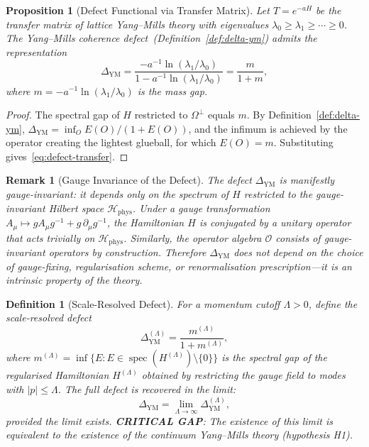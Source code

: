 \documentclass[11pt]{article}
\newtheorem{proposition}[theorem]{Proposition}
\newtheorem{definition}[theorem]{Definition}
\newtheorem{remark}[theorem]{Remark}
\DeclareMathOperator{\spec}{spec}
\begin{document}
\begin{proposition}[Defect Functional via Transfer Matrix]
\label{prop:defect-transfer}
Let $T = e^{-aH}$ be the transfer matrix of lattice Yang--Mills theory
with eigenvalues $\lambda_0 \geq \lambda_1 \geq \cdots \geq 0$.  The
Yang--Mills coherence defect~(Definition~\ref{def:delta-ym}) admits the
representation
\begin{equation}\label{eq:defect-transfer}
  \Delta_{\mathrm{YM}}
  = \frac{-a^{-1}\ln(\lambda_1/\lambda_0)}{1 - a^{-1}\ln(\lambda_1/\lambda_0)}
  = \frac{m}{1+m},
\end{equation}
where $m = -a^{-1}\ln(\lambda_1/\lambda_0)$ is the mass gap.
\end{proposition}

\begin{proof}
The spectral gap of $H$ restricted to $\Omega^\perp$ equals $m$.  By
Definition~\ref{def:delta-ym}, $\Delta_{\mathrm{YM}} = \inf_{O} E(O)/(1+E(O))$,
and the infimum is achieved by the operator creating the lightest glueball,
for which $E(O) = m$.  Substituting gives~\eqref{eq:defect-transfer}.
\end{proof}

\begin{remark}[Gauge Invariance of the Defect]
\label{rem:gauge-inv}
The defect $\Delta_{\mathrm{YM}}$ is manifestly gauge-invariant:
it depends only on the spectrum of $H$ restricted to the gauge-invariant
Hilbert space $\mathcal{H}_{\mathrm{phys}}$.  Under a gauge transformation
$A_\mu \mapsto g A_\mu g^{-1} + g\,\partial_\mu g^{-1}$, the
Hamiltonian $H$ is conjugated by a unitary operator that acts trivially
on $\mathcal{H}_{\mathrm{phys}}$.  Similarly, the operator algebra
$\mathcal{O}$ consists of gauge-invariant operators by construction.
Therefore $\Delta_{\mathrm{YM}}$ does not depend on the choice of
gauge-fixing, regularisation scheme, or renormalisation prescription---it
is an intrinsic property of the theory.
\end{remark}

\begin{definition}[Scale-Resolved Defect]
\label{def:scale-defect}
For a momentum cutoff $\Lambda > 0$, define the \emph{scale-resolved defect}
\begin{equation}\label{eq:scale-resolved}
  \Delta_{\mathrm{YM}}^{(\Lambda)}
  = \frac{m^{(\Lambda)}}{1 + m^{(\Lambda)}},
\end{equation}
where $m^{(\Lambda)} = \inf\bigl\{E : E \in \spec(H^{(\Lambda)}) \setminus
\{0\}\bigr\}$ is the spectral gap of the regularised Hamiltonian
$H^{(\Lambda)}$ obtained by restricting the gauge field to modes with
$|p| \leq \Lambda$.  The full defect is recovered in the limit:
\begin{equation}\label{eq:defect-limit}
  \Delta_{\mathrm{YM}} = \lim_{\Lambda \to \infty}
  \Delta_{\mathrm{YM}}^{(\Lambda)},
\end{equation}
provided the limit exists.  \textbf{CRITICAL GAP}: The existence of
this limit is equivalent to the existence of the continuum Yang--Mills
theory (hypothesis H1).
\end{definition}
\end{document}
